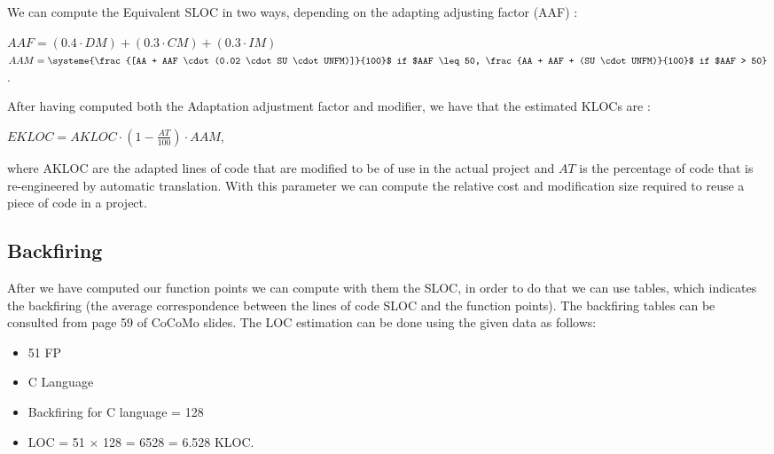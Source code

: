 We can compute the Equivalent SLOC in two ways, depending on the adapting adjusting factor (AAF) :
\begin{center}
    $AAF = (0.4 \cdot DM) + (0.3 \cdot CM) + (0.3 \cdot IM)$\\$AAM = \systeme{\frac{[AA + AAF \cdot (0.02 \cdot SU \cdot UNFM)]}{100}$ if $AAF \leq 50, \frac{AA + AAF + (SU \cdot UNFM)}{100}$ if $AAF > 50}$.
\end{center}
After having computed both the Adaptation adjustment factor and modifier, we have that the estimated KLOCs are :
\begin{center}
    $EKLOC = AKLOC \cdot (1 - \frac{AT}{100}) \cdot AAM$,
\end{center}
where AKLOC are the adapted lines of code that are modified to be of use in the actual project and $AT$ is the percentage of code that is re-engineered by automatic translation. With this parameter we can compute the relative cost and modification size required to reuse a piece of code in a project.
\subsection{Backfiring}
After we have computed our function points we can compute with them the SLOC, in order to do that we can use tables, which indicates the backfiring (the average correspondence between the lines of code SLOC and the function points). The backfiring tables can be consulted from page 59 of CoCoMo slides.
The LOC estimation can be done using the given data as follows:
\begin{itemize}
    \item 51 FP
    \item C Language
    \item Backfiring for C language = 128
    \item LOC = 51 × 128 = 6528 = 6.528 KLOC.
\end{itemize}

